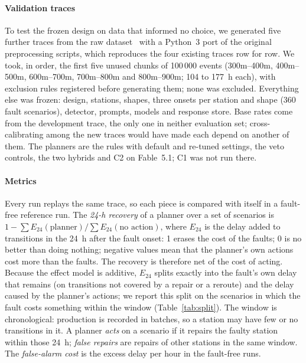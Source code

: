 \documentclass[preprint,11pt]{elsarticle}
\begin{document}
\paragraph{Validation traces}
To test the frozen design on data that informed no choice, we generated five further traces from the raw dataset~\cite{bosch2016kaggle} with a Python~3 port of the original preprocessing scripts, which reproduces the four existing traces row for row. We took, in order, the first five unused chunks of 100\,000 events (300m--400m, 400m--500m, 600m--700m, 700m--800m and 800m--900m; 104 to 177~h each), with exclusion rules registered before generating them; none was excluded. Everything else was frozen: design, stations, shapes, three onsets per station and shape (360 fault scenarios), detector, prompts, models and response store. Base rates come from the development trace, the only one in neither evaluation set; cross-calibrating among the new traces would have made each depend on another of them. The planners are the rules with default and re-tuned settings, the veto controls, the two hybrids and C2 on Fable~5.1; C1 was not run there.

\paragraph{Metrics}
Every run replays the same trace, so each piece is compared with itself in a fault-free reference run. The \emph{24-h recovery} of a planner over a set of scenarios is $1-\sum E_{24}(\text{planner}) / \sum E_{24}(\text{no action})$, where $E_{24}$ is the delay added to transitions in the 24~h after the fault onset: 1 erases the cost of the faults; 0 is no better than doing nothing; negative values mean that the planner's own actions cost more than the faults. The recovery is therefore net of the cost of acting. Because the effect model is additive, $E_{24}$ splits exactly into the fault's own delay that remains (on transitions not covered by a repair or a reroute) and the delay caused by the planner's actions; we report this split on the scenarios in which the fault costs something within the window (Table~\ref{tab:split}). The window is chronological: production is recorded in batches, so a station may have few or no transitions in it. A planner \emph{acts} on a scenario if it repairs the faulty station within those 24~h; \emph{false repairs} are repairs of other stations in the same window. The \emph{false-alarm cost} is the excess delay per hour in the fault-free runs.
\end{document}
